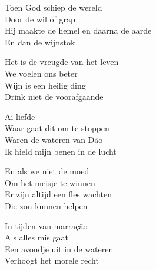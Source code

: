 \begin{translation}
Toen God schiep de wereld\\
Door de wil of grap\\
Hij maakte de hemel en daarna de aarde\\
En dan de wijnstok\vspace{2.1ex}

Het is de vreugde van het leven\\
We voelen ons beter\\
Wijn is een heilig ding\\
Drink niet de voorafgaande\vspace{2.1ex}

Ai liefde\\
Waar gaat dit om te stoppen\\
Waren de wateren van Dão\\
Ik hield mijn benen in de lucht\vspace{2.1ex}

En als we niet de moed\\
Om het meisje te winnen\\
Er zijn altijd een fles wachten\\
Die zou kunnen helpen\vspace{2.1ex}

In tijden van marração\\
Als alles mis gaat\\
Een avondje uit in de wateren\\
Verhoogt het morele recht
\end{translation}
